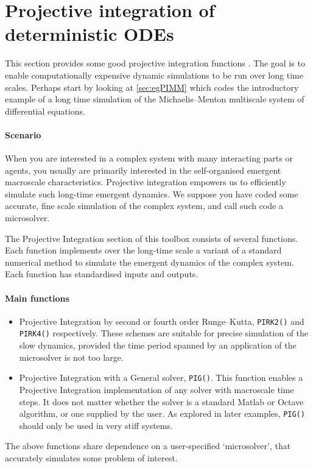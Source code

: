 \section{Projective integration of deterministic ODEs}
\label{sec:ProjInt}
\localtableofcontents

This section provides some good projective integration functions \cite[e.g.]{Gear02b, Gear03c, Givon06}.
The goal is to enable computationally expensive dynamic simulations to be run over long time scales.
Perhaps start by looking at \cref{sec:egPIMM} which codes the introductory example of a long time simulation of the Michaelis--Menton multiscale system of differential equations.

\paragraph{Scenario}
When you are interested in a complex system with many interacting parts or agents, you usually are primarily interested in the self-organised emergent macroscale characteristics.
Projective integration empowers us to efficiently simulate such long-time emergent dynamics.
We suppose you have coded some accurate, fine scale simulation of the complex system, and call such code a microsolver.

The Projective Integration section of this toolbox consists of several functions.
Each function implements over the long-time scale a variant of a standard numerical method to simulate the emergent dynamics of the complex system.
Each function has standardised inputs and outputs.

\paragraph{Main functions}
\begin{itemize}
\item Projective Integration by second or fourth order Runge--Kutta, \verb|PIRK2()| and \verb|PIRK4()| respectively.
These schemes are suitable for precise simulation of the slow dynamics, provided the time period spanned by an application of the microsolver is not too large.
\item Projective Integration with a General solver, \verb|PIG()|.
This function enables a Projective Integration implementation of any solver with macroscale time steps.
It does not matter whether the solver is a standard Matlab or Octave algorithm, or one supplied by the user.
As explored in later examples, \verb|PIG()| should only be used in very stiff systems. 
\end{itemize}
The above functions share dependence on a user-specified `microsolver', that accurately simulates some problem of interest. 

